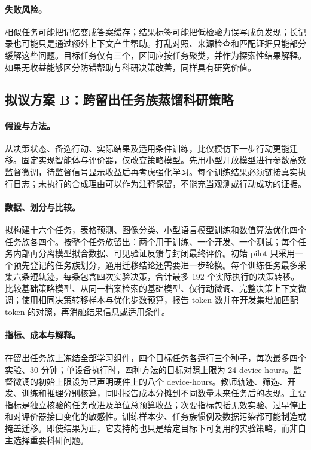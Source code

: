 \paragraph{失败风险。}
相似任务可能把记忆变成答案缓存；结果标签可能把低检验力误写成负发现；长记录也可能只是通过额外上下文产生帮助。打乱对照、来源检查和匹配证据只能部分缓解这些问题。目标任务仅有三个，区间应按任务聚类，并作为探索性结果解释。如果无收益能够区分防错帮助与科研决策改善，同样具有研究价值。

\subsection{拟议方案 B：跨留出任务族蒸馏科研策略}

\paragraph{假设与方法。}
从决策状态、备选行动、实际结果及适用条件训练，比仅模仿下一步行动更能迁移。固定实现智能体与评价器，仅改变策略模型。先用小型开放模型进行参数高效监督微调，待监督信号显示收益后再考虑强化学习。每个训练结果必须链接真实执行日志；未执行的合成理由可以作为注释保留，不能充当观测或行动成功的证据。

\paragraph{数据、划分与比较。}
拟构建十六个任务，表格预测、图像分类、小型语言模型训练和数值算法优化四个任务族各四个。按整个任务族留出：两个用于训练、一个开发、一个测试；每个任务内部再分离模型拟合数据、可见验证反馈与封闭最终评价。初始 pilot 只采用一个预先登记的任务族划分，通用迁移结论还需要进一步轮换。每个训练任务最多采集六条短轨迹，每条包含四次实验决策，合计最多 192 个实际执行的决策转移。比较基础策略模型、从同一档案检索的基础模型、仅行动微调、完整决策上下文微调；使用相同决策转移样本与优化步数预算，报告 token 数并在开发集增加匹配 token 的对照，再消融结果信息或适用条件。

\paragraph{指标、成本与解释。}
在留出任务族上冻结全部学习组件，四个目标任务各运行三个种子，每次最多四个实验、30 分钟；单设备执行时，四种方法的目标对照上限为 24 device-hours。监督微调的初始上限设为已声明硬件上的八个 device-hours。教师轨迹、筛选、开发、训练和推理分别核算，同时报告成本分摊到不同数量未来任务后的表现。主要指标是独立核验的任务改进及单位总预算收益；次要指标包括无效实验、过早停止和对评价器接口变化的敏感性。训练样本少、任务族惯例及数据污染都可能制造或掩盖迁移。即使结果为正，它支持的也只是给定目标下可复用的实验策略，而非自主选择重要科研问题。
